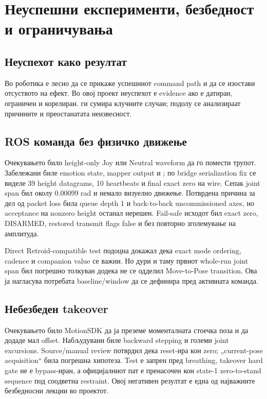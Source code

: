 \chapter{Неуспешни експерименти, безбедност и ограничувања}
\label{chap:failures}

\section{Неуспехот како резултат}

Во роботика е лесно да се прикаже успешниот command path и да се изостави
отсуството на ефект. Во овој проект неуспехот е evidence ако е датиран,
ограничен и корелиран.  ги сумира клучните случаи; подолу
се анализираат причините и преостанатата неизвесност.



\section{ROS команда без физичко движење}

Очекувањето било height-only Joy или Neutral waveform да го помести трупот.
Забележани биле emotion state, mapper output и ; по bridge
serialization fix се виделе 39 height datagrams, 10 heartbeats и final exact
zero на wire. Сепак joint span бил околу 0.00099 rad и немало визуелно
движење. Потврдена причина за дел од packet loss била queue depth 1 и
back-to-back uncommissioned axes, но  acceptance на nonzero
height останал нерешен. Fail-safe исходот бил exact zero, DISARMED, restored
transmit flags false и без повторно зголемување на амплитуда.

Direct Retroid-compatible test подоцна докажал дека exact mode ordering,
cadence и companion value се важни. Но дури и таму првиот whole-run joint span
бил погрешно толкуван додека не се одделил Move-to-Pose transition. Ова ја
нагласува потребата baseline/window да се дефинира пред активната команда.

\section{Небезбеден takeover}

Очекувањето било MotionSDK да ја преземе моменталната стоечка поза и да додаде
мал offset. Набљудувани биле backward stepping и големи joint excursions.
Source/manual review потврдил дека  reset-ира кон zero;
„current-pose acquisition“ била погрешна хипотеза. Test е запрен пред breathing,
takeover hard gate не е bypass-иран, а официјалниот пат е пренасочен кон
state-1 zero-to-stand sequence под соодветна restraint. Овој негативен
резултат е една од најважните безбедносни лекции во проектот.

